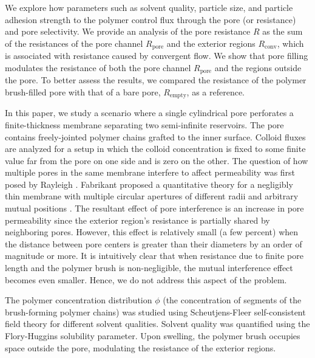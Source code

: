 \documentclass[12pt, a4paper]{article}
\begin{document}
We explore how parameters such as solvent quality, particle size, and particle adhesion strength to the polymer control flux through the pore (or resistance) and pore selectivity.
We provide an analysis of the pore resistance $R$ as the sum of the resistances of the pore channel $R_{\text{pore}}$ and the exterior regions $R_{\text{conv}}$, which is associated with resistance caused by convergent flow.
We show that pore filling modulates the resistance of both the pore channel $R_{\text{pore}}$ and the regions outside the pore.
To better assess the results, we compared the resistance of the polymer brush-filled pore with that of a bare pore, $R_{\text{empty}}$, as a reference. 

In this paper, we study a scenario where a single cylindrical pore perforates a finite-thickness membrane separating two semi-infinite reservoirs.
The pore contains freely-jointed polymer chains grafted to the inner surface.
Colloid fluxes are analyzed for a setup in which the colloid concentration is fixed to some finite value far from the pore on one side and is zero on the other.
The question of how multiple pores in the same membrane interfere to affect permeability was first posed by Rayleigh \cite{Strutt1878}.
Fabrikant proposed a quantitative theory for a negligibly thin membrane with multiple circular apertures of different radii and arbitrary mutual positions \cite{Fabrikant1985}.
The resultant effect of pore interference is an increase in pore permeability since the exterior region's resistance is partially shared by neighboring pores.
However, this effect is relatively small (a few percent) when the distance between pore centers is greater than their diameters by an order of magnitude or more.
It is intuitively clear that when resistance due to finite pore length and the polymer brush is non-negligible, the mutual interference effect becomes even smaller.
Hence, we do not address this aspect of the problem.

The polymer concentration distribution $\phi$ (the concentration of segments of the brush-forming polymer chains) was studied using Scheutjens-Fleer self-consistent field theory for different solvent qualities.
Solvent quality was quantified using the Flory-Huggins solubility parameter.
Upon swelling, the polymer brush occupies space outside the pore, modulating the resistance of the exterior regions.
\end{document}
